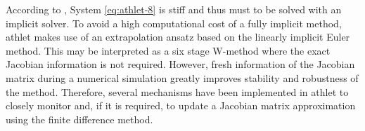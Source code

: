 
According to  \cite{lt:ATHLMaM}, System \ref{eq:athlet-8} is stiff and thus must to be solved with an implicit solver. To avoid a high computational cost of a fully implicit method, \acrshort{athlet} makes use of an extrapolation ansatz based on the linearly implicit Euler method. This may be interpreted as a six stage W-method where the exact Jacobian information is not required. However, fresh information of the Jacobian matrix during a numerical simulation greatly improves stability and robustness of the method. Therefore, several mechanisms have been implemented in \acrshort{athlet} to closely monitor and, if it is required, to update a Jacobian matrix approximation using the finite difference method.\\




